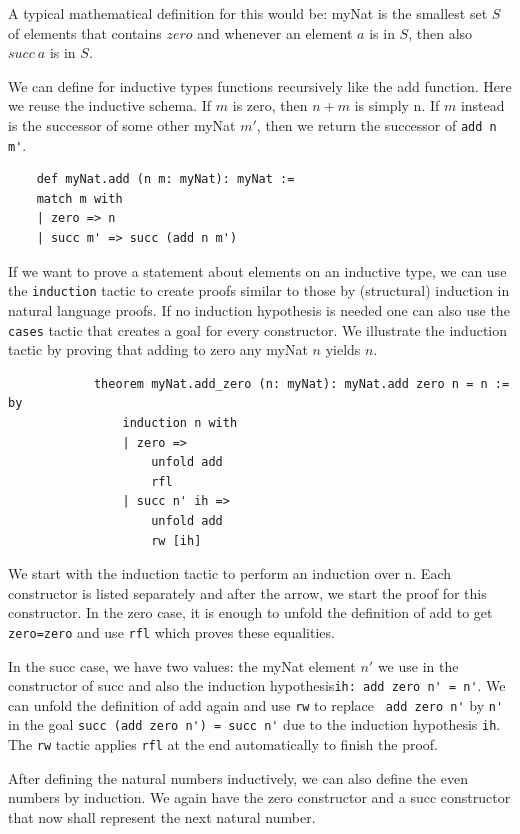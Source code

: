A typical mathematical definition for this would be: myNat is the smallest set $S$ of elements that contains $zero$ and whenever an element $a$ is in $S$, then also $succ\ a$ is in $S$.

We can define for inductive types functions recursively like the add function. Here we reuse the inductive schema. If $m$ is zero, then $n+m$ is simply n. If $m$ instead is the successor of some other myNat $m'$, then we return the successor of \lstinline|add n m'|.

\begin{lstlisting}
    def myNat.add (n m: myNat): myNat :=
    match m with
    | zero => n
    | succ m' => succ (add n m')
\end{lstlisting}

If we want to prove a statement about elements on an inductive type, we can use the \lstinline|induction| tactic to create proofs similar to those by (structural) induction in natural language proofs. If no induction hypothesis is needed one can also use the \lstinline|cases| tactic that creates a goal for every constructor. We illustrate the induction tactic by proving that adding to zero any myNat $n$ yields $n$.

\begin{lstlisting}
            theorem myNat.add_zero (n: myNat): myNat.add zero n = n := by
                induction n with
                | zero =>
                    unfold add
                    rfl
                | succ n' ih =>
                    unfold add
                    rw [ih]
\end{lstlisting}

We start with the induction tactic to perform an induction over n. Each constructor is listed separately and after the arrow, we start the proof for this constructor. In the zero case, it is enough to unfold the definition of add to get \lstinline|zero=zero| and use \lstinline|rfl| which proves these equalities.

In the succ case, we have two values:  the myNat element $n'$ we use in the constructor of succ and also the induction hypothesis\lstinline|ih: add zero n' = n'|. We can unfold the definition of add again and use \lstinline|rw| to replace \lstinline| add zero n'| by \lstinline|n'| in the goal \lstinline|succ (add zero n') = succ n'| due to the induction hypothesis \lstinline|ih|. The \lstinline|rw| tactic applies \lstinline|rfl| at the end automatically to finish the proof.

After defining the natural numbers inductively, we can also define the even numbers by induction. We again have the zero constructor and a succ constructor that now shall represent the next natural number.

